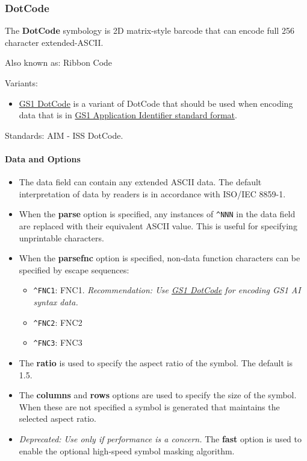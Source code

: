 \hypertarget{dotcode}{%
\subsubsection{DotCode}\label{dotcode}}

The \textbf{DotCode} symbology is 2D matrix-style barcode that can
encode full 256 character extended-ASCII.

Also known as: Ribbon Code

Variants:

\begin{itemize}
\tightlist
\item
  \protect\hyperlink{gs1-dotcode}{GS1 DotCode} is a variant of DotCode
  that should be used when encoding data that is in
  \protect\hyperlink{gs1-application-identifier-standard-format}{GS1
  Application Identifier standard format}.
\end{itemize}

Standards: AIM - ISS DotCode.

\hypertarget{data-and-options-66}{%
\paragraph{Data and Options}\label{data-and-options-66}}

\begin{itemize}
\tightlist
\item
  The data field can contain any extended ASCII data. The default
  interpretation of data by readers is in accordance with ISO/IEC
  8859-1.
\item
  When the \textbf{parse} option is specified, any instances of
  \texttt{\^{}NNN} in the data field are replaced with their equivalent
  ASCII value. This is useful for specifying unprintable characters.
\item
  When the \textbf{parsefnc} option is specified, non-data function
  characters can be specified by escape sequences:

  \begin{itemize}
  \tightlist
  \item
    \texttt{\^{}FNC1}: FNC1. \emph{Recommendation: Use
    \protect\hyperlink{gs1-dotcode}{GS1 DotCode} for encoding GS1 AI
    syntax data.}
  \item
    \texttt{\^{}FNC2}: FNC2
  \item
    \texttt{\^{}FNC3}: FNC3
  \end{itemize}
\item
  The \textbf{ratio} is used to specify the aspect ratio of the symbol.
  The default is 1.5.
\item
  The \textbf{columns} and \textbf{rows} options are used to specify the
  size of the symbol. When these are not specified a symbol is generated
  that maintains the selected aspect ratio.
\item
  \emph{Deprecated: Use only if performance is a concern.} The
  \textbf{fast} option is used to enable the optional high-speed symbol
  masking algorithm.
\end{itemize}


